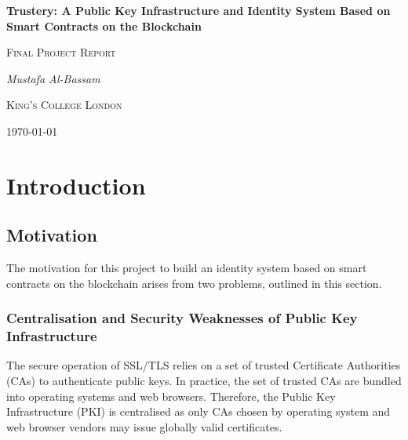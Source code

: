 \documentclass[12pt,a4paper]{report}
\newenvironment{originality}
	{\renewcommand{\abstractname}{Originality Avowal}
		\begin{abstract}}
	{\end{abstract}
		\clearpage}
\newenvironment{acknowledgements}
	{\renewcommand{\abstractname}{Acknowledgements}
		\begin{abstract}}
	{\end{abstract}
		\clearpage}
\begin{document}
	\begin{titlepage}
		\centering
		{\huge\bfseries Trustery: A Public Key Infrastructure and Identity System Based on Smart Contracts on the Blockchain\par}
		\vspace{1cm}
		{\Large\scshape Final Project Report\par}
		\vspace{1.5cm}
		{\Large\itshape Mustafa Al-Bassam\par}
		\vfill
		{\LARGE\scshape King's College London\par}
		\vfill
		{\large \today\par}
	\end{titlepage}
	
	\begin{abstract}
		test
	\end{abstract}
	
	\begin{acknowledgements}
		test
	\end{acknowledgements}
	
	\begin{originality}
		I verify that I am the sole author of this report, except for the content of this originality avowal and where explicitly stated to the contrary.
		
		I grant King's College London the right to make paper and electronic copies of the submitted work for purposes of marking, plagiarism detection and archival, and to upload a copy of the work to a trusted plagiarism detection service. I confirm this report does not exceed 25,000 words.
		
		\bigskip
		\noindent Mustafa Al-Bassam\newline
		\today
	\end{originality}
	
	\tableofcontents
	
	\chapter{Introduction}
	\section{Motivation}
	The motivation for this project to build an identity system based on smart contracts on the blockchain arises from two problems, outlined in this section.
	
	\subsection{Centralisation and Security Weaknesses of Public Key Infrastructure}
	The secure operation of SSL/TLS relies on a set of trusted Certificate Authorities (CAs) to authenticate public keys\cite{1}. In practice, the set of trusted CAs are bundled into operating systems and web browsers. Therefore, the Public Key Infrastructure (PKI) is centralised as only CAs chosen by operating system and web browser vendors may issue globally valid certificates.
\end{document}
